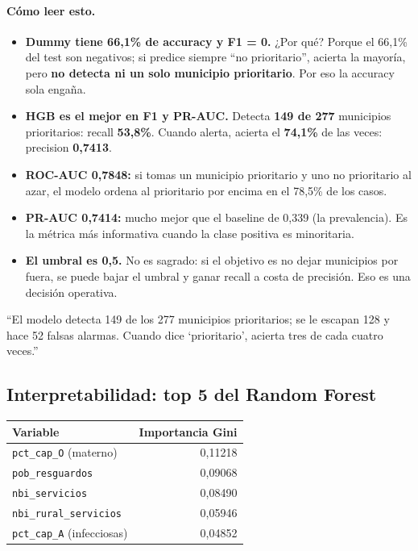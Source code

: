 \documentclass[11pt,a4paper]{article}
\newcommand{\code}[1]{\texttt{#1}}
\begin{document}
\paragraph{Cómo leer esto.}
\begin{itemize}[leftmargin=*]
  \item \textbf{Dummy tiene 66,1\% de accuracy y F1 = 0.} ¿Por qué? Porque el 66,1\% del test son negativos; si predice siempre ``no prioritario'', acierta la mayoría, pero \textbf{no detecta ni un solo municipio prioritario}. Por eso la accuracy sola engaña.
  \item \textbf{HGB es el mejor en F1 y PR-AUC.} Detecta \textbf{149 de 277} municipios prioritarios: recall \textbf{53,8\%}. Cuando alerta, acierta el \textbf{74,1\%} de las veces: precision \textbf{0,7413}.
  \item \textbf{ROC-AUC 0,7848:} si tomas un municipio prioritario y uno no prioritario al azar, el modelo ordena al prioritario por encima en el 78,5\% de los casos.
  \item \textbf{PR-AUC 0,7414:} mucho mejor que el baseline de 0,339 (la prevalencia). Es la métrica más informativa cuando la clase positiva es minoritaria.
  \item \textbf{El umbral es 0,5.} No es sagrado: si el objetivo es no dejar municipios por fuera, se puede bajar el umbral y ganar recall a costa de precisión. Eso es una decisión operativa.
\end{itemize}

\begin{tcolorbox}[idea,title={Cómo explicar la matriz en una frase}]
``El modelo detecta 149 de los 277 municipios prioritarios; se le escapan 128 y hace 52 falsas alarmas. Cuando dice `prioritario', acierta tres de cada cuatro veces.''
\end{tcolorbox}

\subsection{Interpretabilidad: top 5 del Random Forest}

\begin{table}[H]
\centering
\small
\begin{tabular}{@{}l r@{}}
\toprule
\textbf{Variable} & \textbf{Importancia Gini} \\
\midrule
\code{pct_cap_O} (materno) & 0,11218 \\
\code{pob_resguardos} & 0,09068 \\
\code{nbi_servicios} & 0,08490 \\
\code{nbi_rural_servicios} & 0,05946 \\
\code{pct_cap_A} (infecciosas) & 0,04852 \\
\bottomrule
\end{tabular}
\end{table}
\end{document}
